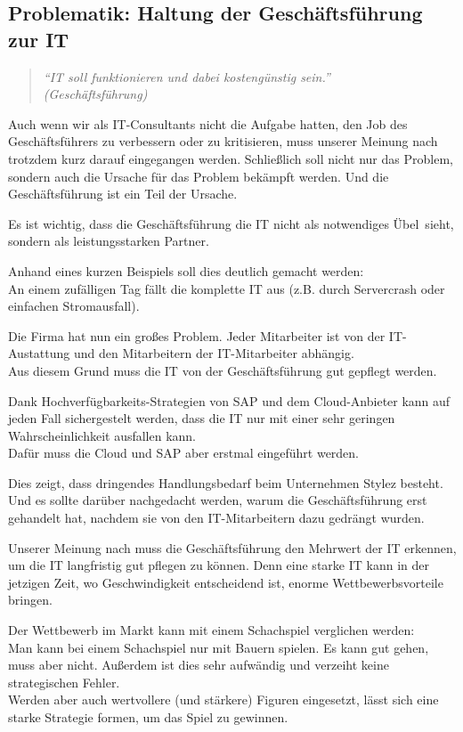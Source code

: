 \subsection{Problematik: Haltung der Geschäftsführung zur IT}
\begin{quote}
\textit{\enquote{IT soll funktionieren und dabei kostengünstig sein.}\\(Geschäftsführung)} 
\end{quote}
Auch wenn wir als IT-Consultants nicht die Aufgabe hatten, den Job des Geschäftsführers zu verbessern oder zu kritisieren, muss unserer Meinung nach trotzdem kurz darauf eingegangen werden.
Schließlich soll nicht nur das Problem, sondern auch die Ursache für das Problem bekämpft werden. Und die Geschäftsführung ist ein Teil der Ursache.

Es ist wichtig, dass die Geschäftsführung die IT nicht als \glqq notwendiges Übel\grqq~sieht, sondern als leistungsstarken Partner.

Anhand eines kurzen Beispiels soll dies deutlich gemacht werden:\\ 
An einem zufälligen Tag fällt die komplette IT aus (z.B. durch Servercrash oder einfachen Stromausfall).

Die Firma hat nun ein großes Problem. Jeder Mitarbeiter ist von der IT-Austattung und den Mitarbeitern der IT-Mitarbeiter abhängig.\\
Aus diesem Grund muss die IT von der Geschäftsführung gut gepflegt werden.

Dank Hochverfügbarkeits-Strategien von SAP und dem Cloud-Anbieter kann auf jeden Fall sichergestelt werden, dass die IT nur mit einer sehr geringen Wahrscheinlichkeit ausfallen kann.\\
Dafür muss die Cloud und SAP aber erstmal eingeführt werden.

Dies zeigt, dass dringendes Handlungsbedarf beim Unternehmen Stylez besteht. Und es sollte darüber nachgedacht werden, warum die Geschäftsführung erst gehandelt hat, nachdem sie von den IT-Mitarbeitern dazu gedrängt wurden.

Unserer Meinung nach muss die Geschäftsführung den Mehrwert der IT erkennen, um die IT langfristig gut pflegen zu können. Denn eine starke IT kann in der jetzigen Zeit, wo Geschwindigkeit entscheidend ist, enorme Wettbewerbsvorteile bringen.

Der Wettbewerb im Markt kann mit einem Schachspiel verglichen werden:\\
Man kann bei einem Schachspiel nur mit Bauern spielen. Es kann gut gehen, muss aber nicht. Außerdem ist dies sehr aufwändig und verzeiht keine strategischen Fehler.\\
Werden aber auch wertvollere (und stärkere) Figuren eingesetzt, lässt sich eine starke Strategie formen, um das Spiel zu gewinnen.

